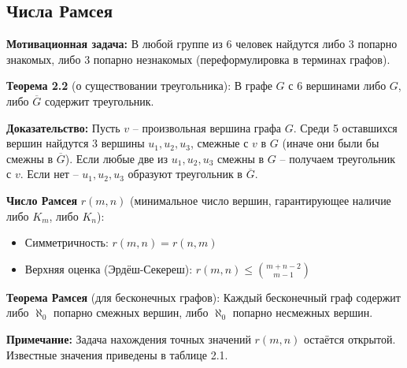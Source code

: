 \subsection{Числа Рамсея}

\noindent\textbf{Мотивационная задача:} В любой группе из 6 человек найдутся либо 3 попарно знакомых, либо 3 попарно незнакомых (переформулировка в терминах графов).

\noindent\textbf{Теорема 2.2} (о существовании треугольника): В графе $G$ с 6 вершинами либо $G$, либо $\overline{G}$ содержит треугольник.

\noindent\textbf{Доказательство:} 
Пусть $v$ -- произвольная вершина графа $G$. Среди 5 оставшихся вершин найдутся 3 вершины $u_1, u_2, u_3$, смежные с $v$ в $G$ (иначе они были бы смежны в $\overline{G}$). Если любые две из $u_1, u_2, u_3$ смежны в $G$ -- получаем треугольник с $v$. Если нет -- $u_1, u_2, u_3$ образуют треугольник в $\overline{G}$.

\noindent\textbf{Число Рамсея} $r(m,n)$ (минимальное число вершин, гарантирующее наличие либо $K_m$, либо $K_n$):
\begin{itemize}[noitemsep,topsep=0pt]
\item Симметричность: $r(m,n) = r(n,m)$
\item Верхняя оценка (Эрдёш-Секереш): $r(m,n) \leq \binom{m + n - 2}{m - 1}$
\end{itemize}

\noindent\textbf{Теорема Рамсея} (для бесконечных графов): Каждый бесконечный граф содержит либо $\aleph_0$ попарно смежных вершин, либо $\aleph_0$ попарно несмежных вершин.

\noindent\textbf{Примечание:} Задача нахождения точных значений $r(m,n)$ остаётся открытой. Известные значения приведены в таблице 2.1.